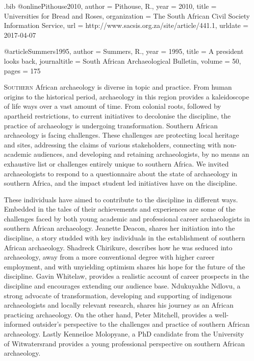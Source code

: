\begin{filecontents}{\IJSRAidentifier.bib}
@online{Pithouse2010,
author = {Pithouse, R.},
year = {2010},
title = {Universities for Bread and Roses},
organization  = {The South African Civil Society Information Service},
url = {http://www.sacsis.org.za/site/article/441.1},
urldate = {2017-04-07}
}

@article{Summers1995,
author = {Summers, R.},
year = {1995},
title = {A president looks back},
journaltitle = {South African Archaeological Bulletin},
volume = {50},
pages  = {175\psq}}
\end{filecontents}
\IJSRAopening
\lettrine{S}{outhern} African archaeology is diverse in topic and practice. From human origins to the historical period, archaeology in this region provides a kaleidoscope of life ways over a vast amount of time. From colonial roots, followed by apartheid restrictions, to current initiatives to decolonise the discipline, the practice of archaeology is undergoing transformation. Southern African archaeology is facing challenges. These challenges are protecting local heritage and sites, addressing the claims of various stakeholders, connecting with non-academic audiences, and developing and retaining archaeologists, by no means an exhaustive list or challenges entirely unique to southern Africa. We invited archaeologists to respond to a questionnaire about the state of archaeology in southern Africa, and the impact student led initiatives have on the discipline. 

These individuals have aimed to contribute to the discipline in different ways. Embedded in the tales of their achievements and experiences are some of the challenges faced by both young academic and professional career archaeologists in southern African archaeology. Jeanette Deacon, shares her initiation into the discipline, a story studded with key individuals in the establishment of southern African archaeology. Shadreck Chirikure, describes how he was seduced into archaeology, away from a more conventional degree with higher career employment, and with unyielding optimism shares his hope for the future of the discipline. Gavin Whitelaw, provides a realistic account of career prospects in the discipline and encourages extending our audience base. Ndukuyakhe Ndlovu, a strong advocate of transformation, developing and supporting of indigenous archaeologists and locally relevant research, shares his journey as an African practicing archaeology. On the other hand, Peter Mitchell, provides a well-informed outsider’s perspective to the challenges and practice of southern African archaeology. Lastly Kenneiloe Molopyane, a PhD candidate from the University of Witwatersrand provides a young professional perspective on southern African archaeology.

